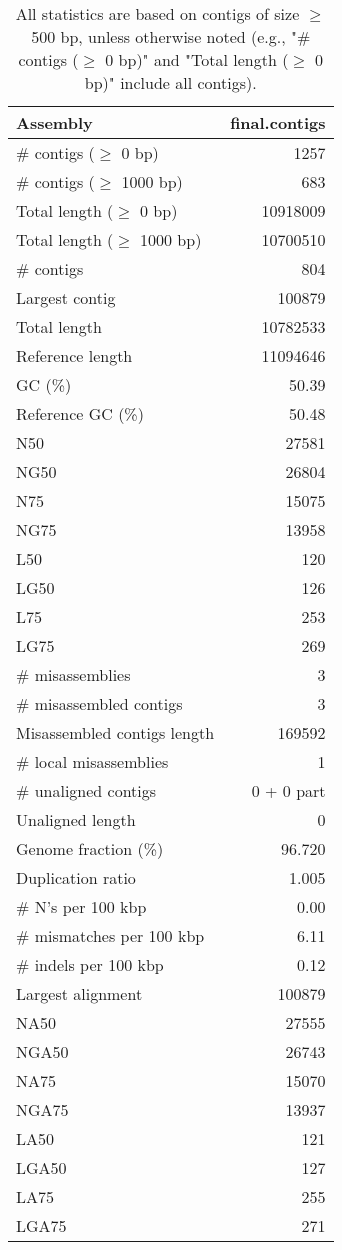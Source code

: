 \documentclass[12pt,a4paper]{article}
\begin{document}
\begin{table}[ht]
\begin{center}
\caption{All statistics are based on contigs of size $\geq$ 500 bp, unless otherwise noted (e.g., "\# contigs ($\geq$ 0 bp)" and "Total length ($\geq$ 0 bp)" include all contigs).}
\begin{tabular}{|l*{1}{|r}|}
\hline
Assembly & final.contigs \\ \hline
\# contigs ($\geq$ 0 bp) & 1257 \\ \hline
\# contigs ($\geq$ 1000 bp) & 683 \\ \hline
Total length ($\geq$ 0 bp) & 10918009 \\ \hline
Total length ($\geq$ 1000 bp) & 10700510 \\ \hline
\# contigs & 804 \\ \hline
Largest contig & 100879 \\ \hline
Total length & 10782533 \\ \hline
Reference length & 11094646 \\ \hline
GC (\%) & 50.39 \\ \hline
Reference GC (\%) & 50.48 \\ \hline
N50 & 27581 \\ \hline
NG50 & 26804 \\ \hline
N75 & 15075 \\ \hline
NG75 & 13958 \\ \hline
L50 & 120 \\ \hline
LG50 & 126 \\ \hline
L75 & 253 \\ \hline
LG75 & 269 \\ \hline
\# misassemblies & 3 \\ \hline
\# misassembled contigs & 3 \\ \hline
Misassembled contigs length & 169592 \\ \hline
\# local misassemblies & 1 \\ \hline
\# unaligned contigs & 0 + 0 part \\ \hline
Unaligned length & 0 \\ \hline
Genome fraction (\%) & 96.720 \\ \hline
Duplication ratio & 1.005 \\ \hline
\# N's per 100 kbp & 0.00 \\ \hline
\# mismatches per 100 kbp & 6.11 \\ \hline
\# indels per 100 kbp & 0.12 \\ \hline
Largest alignment & 100879 \\ \hline
NA50 & 27555 \\ \hline
NGA50 & 26743 \\ \hline
NA75 & 15070 \\ \hline
NGA75 & 13937 \\ \hline
LA50 & 121 \\ \hline
LGA50 & 127 \\ \hline
LA75 & 255 \\ \hline
LGA75 & 271 \\ \hline
\end{tabular}
\end{center}
\end{table}
\end{document}
